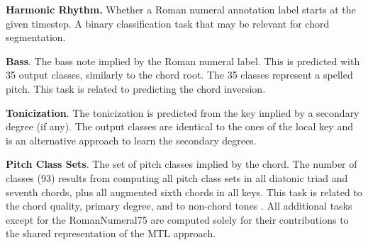 \textbf{Harmonic Rhythm.} Whether a Roman numeral annotation
label starts at the given timestep. A binary classification
task that may be relevant for chord segmentation.

\textbf{Bass}. The bass note implied by the Roman numeral
label. This is predicted with 35 output classes, similarly
to the chord root. The 35 classes represent a spelled pitch.
This task is related to predicting the chord inversion.

\textbf{Tonicization}. The tonicization is predicted from
the key implied by a secondary degree (if any).
The output classes are identical to the ones of the local
key and is an alternative approach to learn the secondary
degrees.

\textbf{Pitch Class Sets}. The set of pitch classes implied
by the chord. The number of classes (93) results from
computing all pitch class sets in all diatonic triad and
seventh chords, plus all augmented sixth chords in all keys.
This task is related to the chord quality, primary degree,
and to non-chord tones \cite{ju2017nonchord}. All additional
tasks except for the RomanNumeral75 are computed solely for
their contributions to the shared representation of the MTL
approach.
